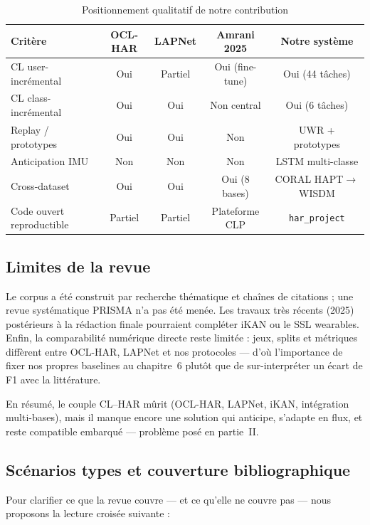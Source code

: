 \documentclass[a4paper,12pt]{report}
\begin{document}
\begin{table}[H]
\centering
\small
\begin{tabularx}{\textwidth}{|>{\raggedright\arraybackslash}Y|c|c|c|c|}
\hline
\textbf{Critère} & \textbf{OCL-HAR} & \textbf{LAPNet} & \textbf{Amrani 2025} & \textbf{Notre système} \\
\hline
CL user-incrémental & Oui & Partiel & Oui (fine-tune) & Oui (44 tâches) \\
CL class-incrémental & Oui & Oui & Non central & Oui (6 tâches) \\
Replay / prototypes & Oui & Oui & Non & UWR + prototypes \\
Anticipation IMU & Non & Non & Non & LSTM multi-classe \\
Cross-dataset & Oui & Oui & Oui (8 bases) & CORAL HAPT$\rightarrow$WISDM \\
Code ouvert reproductible & Partiel & Partiel & Plateforme CLP & \texttt{har\_project} \\
\hline
\end{tabularx}
\caption{Positionnement qualitatif de notre contribution}
\label{tab:positionnement_nous}
\end{table}

\subsection{Limites de la revue}

Le corpus a été construit par recherche thématique et chaînes de citations ;
une revue systématique PRISMA n'a pas été menée. Les travaux très récents (2025)
postérieurs à la rédaction finale pourraient compléter iKAN ou le SSL wearables.
Enfin, la comparabilité numérique directe reste limitée : jeux, splits et métriques
diffèrent entre OCL-HAR, LAPNet et nos protocoles — d'où l'importance de fixer
nos propres baselines au chapitre~6 plutôt que de sur-interpréter un écart de F1
avec la littérature.

En résumé, le couple CL–HAR mûrit (OCL-HAR, LAPNet, iKAN, intégration
multi-bases), mais il manque encore une solution qui anticipe, s'adapte en flux,
et reste compatible embarqué — problème posé en partie~II.

\subsection{Scénarios types et couverture bibliographique}

Pour clarifier ce que la revue couvre — et ce qu'elle ne couvre pas — nous
proposons la lecture croisée suivante :
\end{document}
